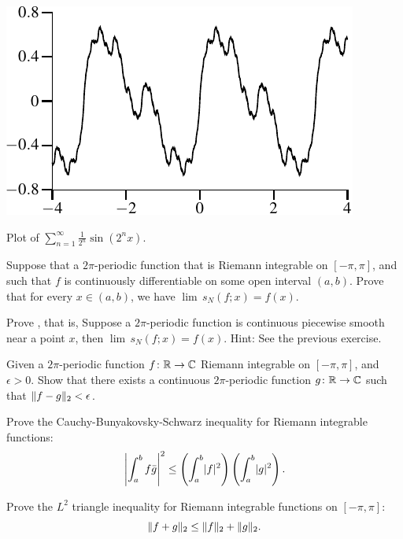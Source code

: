 \begin{myfigureht}
\includegraphics{figures/fourierserweier}
\caption{Plot of 
$\sum_{n=1}^\infty \frac{1}{2^n} \sin(2^n x)$.\label{fig:fourierserweier}}
\end{myfigureht}

\begin{exercise}
Suppose that a $2\pi$-periodic function that is Riemann integrable
on $[-\pi,\pi]$, and such that $f$ is continuously differentiable
on some open interval $(a,b)$.  Prove that
for every $x \in (a,b)$, we have $\lim\, s_N(f;x) = f(x)$.
\end{exercise}

\begin{exercise}
Prove , that is,
Suppose a $2\pi$-periodic function is continuous piecewise
smooth near a point $x$, then $\lim\, s_N(f;x) = f(x)$.  Hint: See the previous
exercise.
\end{exercise}

\begin{exercise}
Given a $2\pi$-periodic function $f \colon {\mathbb{R}} \to {\mathbb{C}}$ Riemann integrable on
$[-\pi,\pi]$,
and $\epsilon > 0$.
Show that there exists a continuous $2\pi$-periodic function $g \colon {\mathbb{R}}
\to {\mathbb{C}}$ such that $\lVert {f-g} \rVert_2 < \epsilon$.
\end{exercise}

\begin{exercise}
Prove the Cauchy-Bunyakovsky-Schwarz inequality
for Riemann integrable functions:
\begin{equation*}
{\left\lvert {\int_a^b f\bar{g}} \right\rvert}^2
\leq
\left( \int_a^b \lvert {f} \rvert^2 \right)
\left( \int_a^b \lvert {g} \rvert^2 \right) .
\end{equation*}
\end{exercise}

\begin{exercise}
Prove the $L^2$ triangle inequality 
for Riemann integrable functions on $[-\pi,\pi]$:
\begin{equation*}
\lVert {f+g} \rVert_2 \leq \lVert {f} \rVert_2 + \lVert {g} \rVert_2 .
\end{equation*}
\end{exercise}

